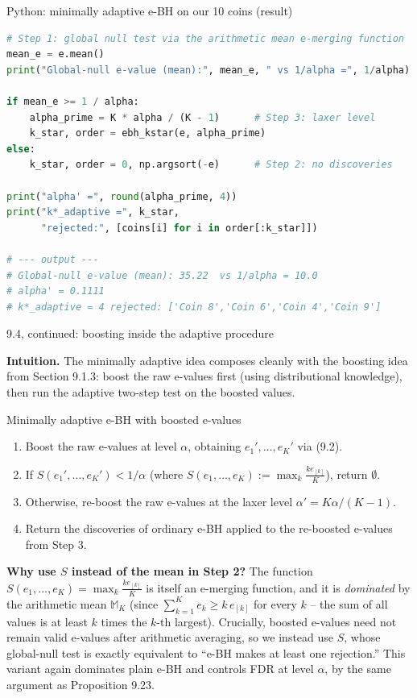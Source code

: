 \documentclass[aspectratio=169,10pt]{beamer}
\begin{document}
\begin{frame}[fragile]{Python: minimally adaptive e-BH on our 10 coins (result)}
\begin{lstlisting}[language=Python]
# Step 1: global null test via the arithmetic mean e-merging function
mean_e = e.mean()
print("Global-null e-value (mean):", mean_e, " vs 1/alpha =", 1/alpha)

if mean_e >= 1 / alpha:
    alpha_prime = K * alpha / (K - 1)      # Step 3: laxer level
    k_star, order = ebh_kstar(e, alpha_prime)
else:
    k_star, order = 0, np.argsort(-e)      # Step 2: no discoveries

print("alpha' =", round(alpha_prime, 4))
print("k*_adaptive =", k_star,
      "rejected:", [coins[i] for i in order[:k_star]])

# --- output ---
# Global-null e-value (mean): 35.22  vs 1/alpha = 10.0
# alpha' = 0.1111
# k*_adaptive = 4 rejected: ['Coin 8','Coin 6','Coin 4','Coin 9']
\end{lstlisting}
\end{frame}

\begin{frame}[allowframebreaks]{9.4, continued: boosting inside the adaptive procedure}

\textbf{Intuition.} The minimally adaptive idea composes cleanly with the boosting idea from Section 9.1.3: boost the raw e-values first (using distributional knowledge), then run the adaptive two-step test on the boosted values.

\begin{block}{Minimally adaptive e-BH with boosted e-values}
\begin{enumerate}
\item Boost the raw e-values at level $\alpha$, obtaining $e_1',\dots,e_K'$ via (9.2).
\item If $S(e_1',\dots,e_K') < 1/\alpha$ (where $S(e_1,\dots,e_K):=\max_k \frac{k e_{[k]}}{K}$), return $\emptyset$.
\item Otherwise, re-boost the raw e-values at the laxer level $\alpha'=K\alpha/(K-1)$.
\item Return the discoveries of ordinary e-BH applied to the re-boosted e-values from Step 3.
\end{enumerate}
\end{block}

\textbf{Why use $S$ instead of the mean in Step 2?} The function $S(e_1,\dots,e_K)=\max_k \frac{k e_{[k]}}{K}$ is itself an e-merging function, and it is \emph{dominated} by the arithmetic mean $\mathbb{M}_K$ (since $\sum_{k=1}^K e_k \ge k\, e_{[k]}$ for every $k$ -- the sum of all values is at least $k$ times the $k$-th largest). Crucially, boosted e-values need not remain valid e-values after arithmetic averaging, so we instead use $S$, whose global-null test is exactly equivalent to ``e-BH makes at least one rejection.'' This variant again dominates plain e-BH and controls FDR at level $\alpha$, by the same argument as Proposition 9.23.

\end{frame}
\end{document}
